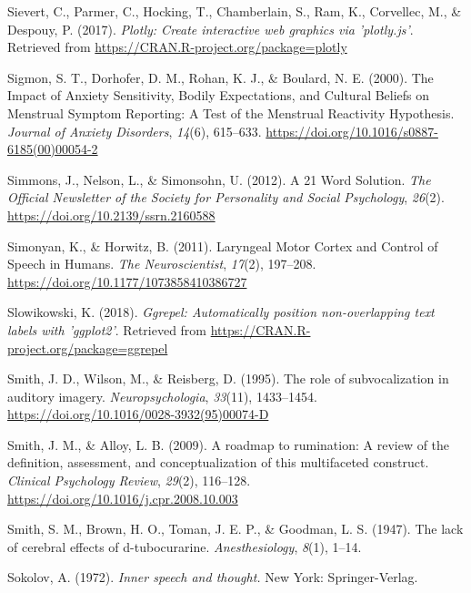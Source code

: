 \documentclass[a4paper,12pt,twoside,openright,oldfontcommands]{memoir}
\begin{document}
\leavevmode\hypertarget{ref-R-plotly}{}%
Sievert, C., Parmer, C., Hocking, T., Chamberlain, S., Ram, K., Corvellec, M., \& Despouy, P. (2017). \emph{Plotly: Create interactive web graphics via 'plotly.js'}. Retrieved from \url{https://CRAN.R-project.org/package=plotly}

\leavevmode\hypertarget{ref-sigmon_impact_2000}{}%
Sigmon, S. T., Dorhofer, D. M., Rohan, K. J., \& Boulard, N. E. (2000). The Impact of Anxiety Sensitivity, Bodily Expectations, and Cultural Beliefs on Menstrual Symptom Reporting: A Test of the Menstrual Reactivity Hypothesis. \emph{Journal of Anxiety Disorders}, \emph{14}(6), 615--633. \url{https://doi.org/10.1016/s0887-6185(00)00054-2}

\leavevmode\hypertarget{ref-simmons_21_2012}{}%
Simmons, J., Nelson, L., \& Simonsohn, U. (2012). A 21 Word Solution. \emph{The Official Newsletter of the Society for Personality and Social Psychology}, \emph{26}(2). \url{https://doi.org/10.2139/ssrn.2160588}

\leavevmode\hypertarget{ref-simonyan_laryngeal_2011}{}%
Simonyan, K., \& Horwitz, B. (2011). Laryngeal Motor Cortex and Control of Speech in Humans. \emph{The Neuroscientist}, \emph{17}(2), 197--208. \url{https://doi.org/10.1177/1073858410386727}

\leavevmode\hypertarget{ref-R-ggrepel}{}%
Slowikowski, K. (2018). \emph{Ggrepel: Automatically position non-overlapping text labels with 'ggplot2'}. Retrieved from \url{https://CRAN.R-project.org/package=ggrepel}

\leavevmode\hypertarget{ref-smith_role_1995}{}%
Smith, J. D., Wilson, M., \& Reisberg, D. (1995). The role of subvocalization in auditory imagery. \emph{Neuropsychologia}, \emph{33}(11), 1433--1454. \url{https://doi.org/10.1016/0028-3932(95)00074-D}

\leavevmode\hypertarget{ref-Smith2009}{}%
Smith, J. M., \& Alloy, L. B. (2009). A roadmap to rumination: A review of the definition, assessment, and conceptualization of this multifaceted construct. \emph{Clinical Psychology Review}, \emph{29}(2), 116--128. \url{https://doi.org/10.1016/j.cpr.2008.10.003}

\leavevmode\hypertarget{ref-smith_lack_1947}{}%
Smith, S. M., Brown, H. O., Toman, J. E. P., \& Goodman, L. S. (1947). The lack of cerebral effects of d-tubocurarine. \emph{Anesthesiology}, \emph{8}(1), 1--14.

\leavevmode\hypertarget{ref-sokolov_inner_1972}{}%
Sokolov, A. (1972). \emph{Inner speech and thought.} New York: Springer-Verlag.
\end{document}
